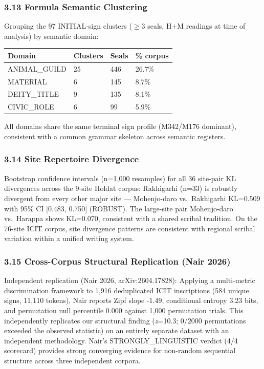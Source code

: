 \documentclass[
  11pt,
]{article}
\newcounter{none} %
\begin{document}
\subsubsection{3.13 Formula Semantic
Clustering}\label{formula-semantic-clustering}

Grouping the 97 INITIAL-sign clusters ($\geq$3 seals, H+M readings at time of
analysis) by semantic domain:

{\def\LTcaptype{none} %
\begin{longtable}[]{@{}llll@{}}
\toprule\noalign{}
Domain & Clusters & Seals & \% corpus \\
\midrule\noalign{}
\endhead
\bottomrule\noalign{}
\endlastfoot
ANIMAL\_GUILD & 25 & 446 & 26.7\% \\
MATERIAL & 6 & 145 & 8.7\% \\
DEITY\_TITLE & 9 & 135 & 8.1\% \\
CIVIC\_ROLE & 6 & 99 & 5.9\% \\
\end{longtable}
}

All domains share the same terminal sign profile (M342/M176 dominant),
consistent with a common grammar skeleton across semantic registers.

\subsubsection{3.14 Site Repertoire
Divergence}\label{site-repertoire-divergence}

Bootstrap confidence intervals (n=1,000 resamples) for all 36 site-pair
KL divergences across the 9-site Holdat corpus: Rakhigarhi (n=33) is
robustly divergent from every other major site --- Mohenjo-daro
vs.~Rakhigarhi KL=0.509 with 95\% CI {[}0.483, 0.750{]} (ROBUST). The
large-site pair Mohenjo-daro vs.~Harappa shows KL=0.070, consistent with
a shared scribal tradition. On the 76-site ICIT corpus, site
divergence patterns are consistent with regional scribal variation
within a unified writing system.

\subsubsection{3.15 Cross-Corpus Structural Replication (Nair
2026)}\label{cross-corpus-structural-replication-nair-2026}

Independent replication (Nair 2026, arXiv:2604.17828): Applying a
multi-metric discrimination framework to 1,916 deduplicated ICIT
inscriptions (584 unique signs, 11,110 tokens), Nair reports Zipf slope
-1.49, conditional entropy 3.23 bits, and permutation null percentile
0.000 against 1,000 permutation trials. This independently replicates
our structural finding (\emph{z}=10.3; 0/2000 permutations exceeded the
observed statistic) on an entirely separate dataset with an independent
methodology. Nair's STRONGLY\_LINGUISTIC verdict (4/4 scorecard)
provides strong converging evidence for non-random sequential structure
across three independent corpora.
\end{document}
